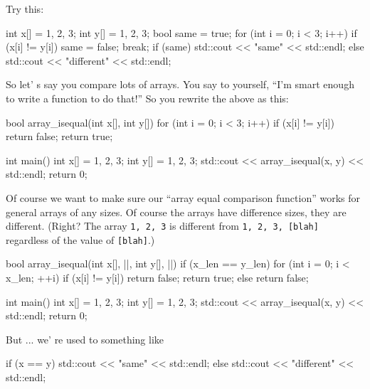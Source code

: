 Try this:

\begin{consolethree}[escapeinside=||]
int x[] = {1, 2, 3};
int y[] = {1, 2, 3};
bool same = true;
for (int i = 0; i < 3; i++)
{
    if (x[i] != y[i])
    {
        same = false;
        break;
    }
}
if (same)
{
    std::cout << "same" << std::endl;
}
else
{
    std::cout << "different" << std::endl;
}
\end{consolethree}

So let' s say you compare lots of arrays. You say to yourself, ``I'm smart enough to write a function to do that!'' So you rewrite the above as this:

\begin{consolethree}[escapeinside=||]
bool array_isequal(int x[], int y[])
{
    for (int i = 0; i < 3; i++)
    {
        if (x[i] != y[i])
        {
            return false;
        }
    }
    return true;
}

int main()
{
    int x[] = {1, 2, 3};
    int y[] = {1, 2, 3};
    std::cout << array_isequal(x, y) << std::endl;
    return 0;
}
\end{consolethree}

Of course we want to make sure our ``array equal comparison function'' works for general arrays of any sizes. Of course the arrays have difference sizes, they are different. (Right? The array \texttt{{1, 2, 3}} is different from \texttt{{1, 2, 3, [blah]}} regardless of the value of \texttt{[blah]}.)

\begin{consolethree}[escapeinside=||]
bool array_isequal(int x[], ||,
                    int y[], ||)
{
    if (x_len == y_len)
    {
        for (int i = 0; i < x_len; ++i)
        {
            if (x[i] != y[i])
            {
                return false;
            }
        }
        return true;
    }
    else
    {
        return false;
    }
}

int main()
{
    int x[] = {1, 2, 3};
    int y[] = {1, 2, 3};
    std::cout << array_isequal(x, y) << std::endl;
    return 0;
}
\end{consolethree}

But ... we' re used to something like

\begin{consolethree}[escapeinside=||]
if (x == y)
{
    std::cout << "same" << std::endl;
}
else
{
    std::cout << "different" << std::endl;
}
\end{consolethree}

